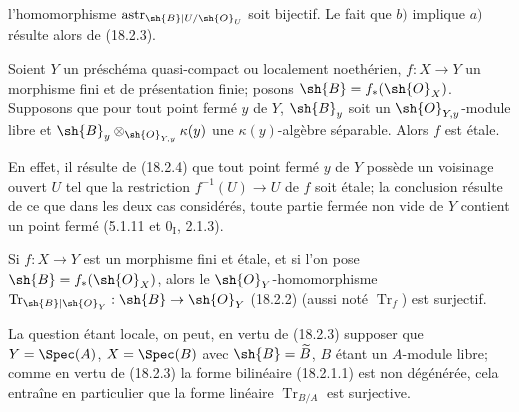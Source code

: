 
l'homomorphisme $\operatorname{astr}_{\sh{B}|U/\sh{O}_U}$ soit bijectif. Le fait que $b)$ implique $a)$ résulte alors de (18.2.3).

\begin{corollary}[18.2.5]
\label{IV.18.2.5}
Soient $Y$ un préschéma quasi-compact ou localement noethérien, $f:X\to Y$ un morphisme fini et de présentation finie; posons $\sh{B}=f_*(\sh{O}_X)$. Supposons que pour tout point fermé $y$ de $Y$, $\sh{B}_y$ soit un $\sh{O}_{Y,y}$-module libre et $\sh{B}_y\otimes_{\sh{O}_{Y,y}}\kappa(y)$ une $\kappa(y)$-algèbre séparable. Alors $f$ est étale.
\end{corollary}

En effet, il résulte de (18.2.4) que tout point fermé $y$ de $Y$ possède un voisinage ouvert $U$ tel que la restriction $f^{-1}(U)\to U$ de $f$ soit étale; la conclusion résulte de ce que dans les deux cas considérés, toute partie fermée non vide de $Y$ contient un point fermé (5.1.11 et $0_{\mathrm I}$, 2.1.3).

\begin{corollary}[18.2.6]
\label{IV.18.2.6}
Si $f:X\to Y$ est un morphisme fini et étale, et si l'on pose $\sh{B}=f_*(\sh{O}_X)$, alors le $\sh{O}_Y$-homomorphisme $\operatorname{Tr}_{\sh{B}|\sh{O}_Y}:\sh{B}\to\sh{O}_Y$ (18.2.2) (aussi noté $\operatorname{Tr}_f$) est surjectif.
\end{corollary}

La question étant locale, on peut, en vertu de (18.2.3) supposer que $Y=\Spec(A)$, $X=\Spec(B)$ avec $\sh{B}=\widetilde B$, $B$ étant un $A$-module libre; comme en vertu de (18.2.3) la forme bilinéaire (18.2.1.1) est non dégénérée, cela entraîne en particulier que la forme linéaire $\operatorname{Tr}_{B/A}$ est surjective.

